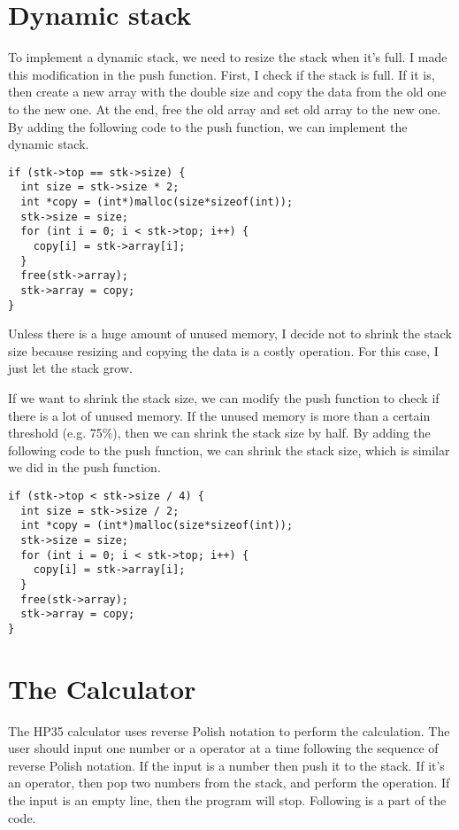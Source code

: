 \documentclass[a4paper,11pt]{article}
\begin{document}
\section*{Dynamic stack}

To implement a dynamic stack, we need to resize the stack when it's full. I made this modification
in the push function. First, I check if the stack is full. If it is, then create a new array 
with the double size and copy the data from the old one to the new one. At the end, free the old
array and set old array to the new one. By adding the following code to the push function, we can
implement the dynamic stack.

\begin{verbatim}
if (stk->top == stk->size) {
  int size = stk->size * 2;
  int *copy = (int*)malloc(size*sizeof(int));
  stk->size = size;
  for (int i = 0; i < stk->top; i++) {
    copy[i] = stk->array[i];
  }
  free(stk->array);
  stk->array = copy;
}
\end{verbatim}

Unless there is a huge amount of unused memory, I decide not to shrink the stack size because 
resizing and copying the data is a costly operation. For this case, I just let the stack grow.

If we want to shrink the stack size, we can modify the push function to check if there is
a lot of unused memory. If the unused memory is more than a certain threshold (e.g. 75\%),
then we can shrink the stack size by half. By adding the following code to the push function,
we can shrink the stack size, which is similar we did in the push function.

\begin{verbatim}
if (stk->top < stk->size / 4) {
  int size = stk->size / 2;
  int *copy = (int*)malloc(size*sizeof(int));
  stk->size = size;
  for (int i = 0; i < stk->top; i++) {
    copy[i] = stk->array[i];
  }
  free(stk->array);
  stk->array = copy;
}
\end{verbatim}

\section*{The Calculator}

The HP35 calculator uses reverse Polish notation to perform the calculation. 
The user should input one number or a operator at a time following the sequence of reverse Polish notation.
If the input is a number then push it to the stack. 
If it's an operator, then pop two numbers from the stack, and perform the operation.
If the input is an empty line, then the program will stop. Following is a part of the code.
\end{document}
